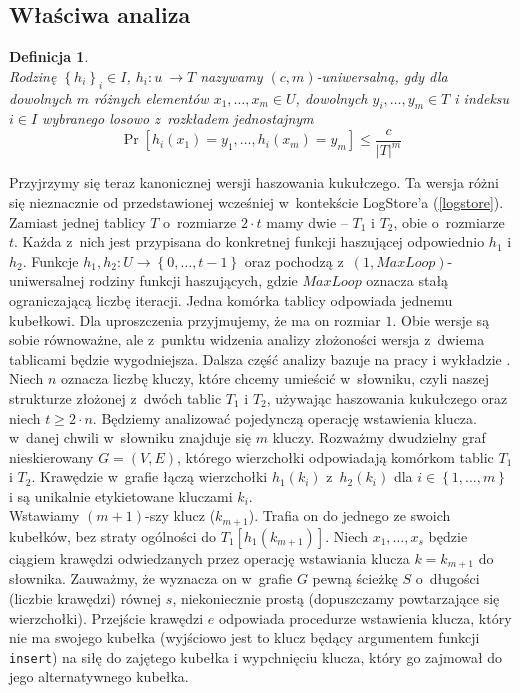 \documentclass[declaration,shortabstract,masc]{iithesis}
\newtheorem{Def}{Definicja}
\newcommand{\bdf}{\begin{Def}~\\\normalfont\indent}
\newcommand{\edf}{\end{Def}\medskip}
\begin{document}
			\subsection{Właściwa analiza}
				\bdf
					Rodzinę $\left\{h_i\right\}_i\in I$, $h_i: u~\to T$ nazywamy $\left(c, m\right)$-uniwersalną, gdy dla dowolnych $m$ różnych elementów $x_1,\ldots,x_m \in U$, dowolnych $y_i,\ldots,y_m \in T$ i indeksu $i \in I$ wybranego losowo z~rozkładem jednostajnym
					$$\Pr[h_i(x_1) = y_1,\ldots,h_i(x_m) = y_m] \leq \frac{c}{|T|^m}$$
				\edf
				Przyjrzymy się teraz kanonicznej wersji haszowania kukułczego. Ta wersja różni się nieznacznie od przedstawionej wcześniej w~kontekście LogStore'a (\ref{logstore}). Zamiast jednej tablicy $T$ o~rozmiarze $2 \cdot t$ mamy dwie -- $T_1$ i $T_2$, obie o~rozmiarze $t$. Każda z~nich jest przypisana do konkretnej funkcji haszującej odpowiednio $h_1$ i $h_2$. Funkcje $h_1, h_2 : U\to\left\{0,\ldots, t - 1\right\}$ oraz pochodzą z~$(1, MaxLoop)$-uniwersalnej rodziny funkcji haszujących, gdzie $MaxLoop$ oznacza stałą ograniczającą liczbę iteracji. Jedna komórka tablicy odpowiada jednemu kubełkowi. Dla uproszczenia przyjmujemy, że ma on rozmiar $1$. Obie wersje są sobie równoważne, ale z~punktu widzenia analizy złożoności wersja z~dwiema tablicami będzie wygodniejsza. Dalsza część analizy bazuje na pracy \cite{CH} i wykładzie \cite{UW}.\\
				\indent Niech $n$ oznacza liczbę kluczy, które chcemy umieścić w~słowniku, czyli naszej strukturze złożonej z~dwóch tablic $T_1$ i $T_2$, używając haszowania kukułczego oraz niech $t\geq 2\cdot n$. Będziemy analizować pojedynczą operację wstawienia klucza.\\
				\indent w~danej chwili w~słowniku znajduje się $m$ kluczy. Rozważmy dwudzielny graf nieskierowany $G=(V,E)$, którego wierzchołki odpowiadają komórkom tablic $T_1$ i $T_2$. Krawędzie w~grafie łączą wierzchołki $h_1(k_i)$ z~$h_2(k_i)$ dla $i \in \left\{1,\ldots,m\right\}$ i są unikalnie etykietowane kluczami $k_i$.\\
				\indent Wstawiamy $(m+1)$-szy klucz ($k_{m+1}$). Trafia on do jednego ze swoich kubełków, bez straty ogólności do $T_1[h_1(k_{m+1})]$. Niech $x_1,\ldots,x_s$ będzie ciągiem krawędzi odwiedzanych przez operację wstawiania klucza $k = k_{m+1}$ do słownika. Zauważmy, że wyznacza on w~grafie $G$ pewną ścieżkę $S$ o~długości (liczbie krawędzi) równej $s$, niekoniecznie prostą (dopuszczamy powtarzające się wierzchołki). Przejście krawędzi $e$ odpowiada procedurze wstawienia klucza, który nie ma swojego kubełka (wyjściowo jest to klucz będący argumentem funkcji \texttt{insert}) na siłę do zajętego kubełka i wypchnięciu klucza, który go zajmował do jego alternatywnego kubełka.
\end{document}
